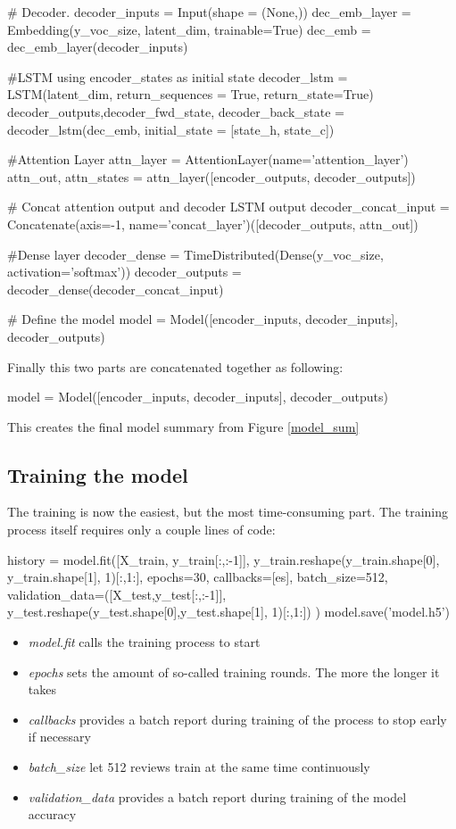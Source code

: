\begin{python}
# Decoder. 
decoder_inputs = Input(shape = (None,)) 
dec_emb_layer = Embedding(y_voc_size, latent_dim, trainable=True) 
dec_emb = dec_emb_layer(decoder_inputs) 

#LSTM using encoder_states as initial state
decoder_lstm = LSTM(latent_dim, return_sequences = True, return_state=True) 
decoder_outputs,decoder_fwd_state, decoder_back_state = decoder_lstm(dec_emb, initial_state = [state_h, state_c]) 

#Attention Layer
attn_layer = AttentionLayer(name='attention_layer') 
attn_out, attn_states = attn_layer([encoder_outputs, decoder_outputs]) 

# Concat attention output and decoder LSTM output 
decoder_concat_input = Concatenate(axis=-1, name='concat_layer')([decoder_outputs, attn_out])

#Dense layer
decoder_dense = TimeDistributed(Dense(y_voc_size, activation='softmax')) 
decoder_outputs = decoder_dense(decoder_concat_input) 

# Define the model
model = Model([encoder_inputs, decoder_inputs], decoder_outputs) 
\end{python}

Finally this two parts are concatenated together as following:

\begin{python}
	model = Model([encoder_inputs, decoder_inputs], decoder_outputs) 
\end{python}

This creates the final model summary from Figure \ref{model_sum}

\subsection{Training the model}

The training is now the easiest, but the most time-consuming part. The training process itself requires only a couple lines of code:

\begin{python}
	history = model.fit([X_train, y_train[:,:-1]], 
	y_train.reshape(y_train.shape[0], y_train.shape[1], 1)[:,1:],
			epochs=30,
			callbacks=[es],
			batch_size=512, 
			validation_data=([X_test,y_test[:,:-1]],
					y_test.reshape(y_test.shape[0],y_test.shape[1], 1)[:,1:])
	)
	model.save('model.h5')
\end{python}

\begin{itemize}
	\item \textit{model.fit} calls the training process to start 
	\item \textit{epochs} sets the amount of so-called training rounds. The more the longer it takes
	\item \textit{callbacks} provides a batch report during training of the process to stop early if necessary
	\item \textit{batch\_size} let 512 reviews train at the same time continuously
	\item \textit{validation\_data} provides a batch report during training of the model accuracy
\end{itemize}

